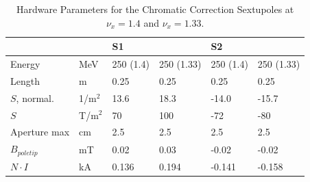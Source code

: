             \begin{center}
              \begin{table}[]
                \centering
                \caption{Hardware Parameters for the Chromatic Correction Sextupoles at $\nu_x=1.4$ and $\nu_x=1.33$.}
                \begin{tabular}{@{}llllll@{}}
                        \toprule
                        &         & \multicolumn{2}{l}{S1} & \multicolumn{2}{l}{S2} \\ \midrule
                        Energy        & MeV     & 250 (1.4) & 250 (1.33) & 250 (1.4) & 250 (1.33) \\
                        Length        & m       & 0.25      & 0.25       & 0.25      & 0.25       \\
                        $S$, normal.  & 1/m$^2$ & 13.6      & 18.3       & -14.0     & -15.7      \\
                        $S$           & T/m$^2$ & 70        & 100        & -72       & -80        \\
                        Aperture max  & cm      & 2.5       & 2.5        & 2.5       & 2.5        \\
                        $B_{poletip}$ & mT      & 0.02      & 0.03       & -0.02     & -0.02      \\
                        $N \cdot I$   & kA      & 0.136     & 0.194      & -0.141    & -0.158     \\ \bottomrule
                      \end{tabular}
                      \label{tab:sext}
                    \end{table} 
                  \end{center}{}
